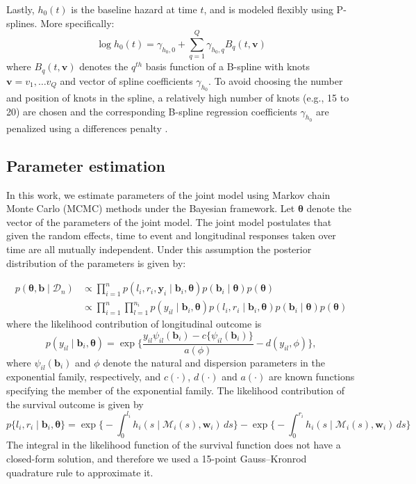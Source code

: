 Lastly, $h_0(t)$ is the baseline hazard at time $t$, and is modeled flexibly using P-splines. More specifically:
\begin{equation*}
\log{h_0(t)} = \gamma_{h_0,0} + \sum_{q=1}^Q \gamma_{h_0,q} B_q(t, \boldsymbol{v})
\end{equation*}
where $B_q(t, \boldsymbol{v})$ denotes the $q^{th}$ basis function of a B-spline with knots $\boldsymbol{v} = v_1, \ldots v_Q$ and vector of spline coefficients $\gamma_{h_0}$. To avoid choosing the number and position of knots in the spline, a relatively high number of knots (e.g., 15 to 20) are chosen and the corresponding B-spline regression coefficients $\gamma_{h_0}$ are penalized using a differences penalty \citep{eilers1996flexible}.

\subsection{Parameter estimation}
In this work, we estimate parameters of the joint model using Markov chain Monte Carlo (MCMC) methods under the Bayesian framework. Let $\boldsymbol{\theta}$ denote the vector of the parameters of the joint model. The joint model postulates that given the random effects, time to event and longitudinal responses taken over time are all mutually independent. Under this assumption the posterior distribution of the parameters is given by:

\begin{align*}
p(\boldsymbol{\theta}, \boldsymbol{b} \mid \mathcal{D}_n) & \propto \prod_{i=1}^n p(l_i, r_i, \boldsymbol{y}_i \mid \boldsymbol{b}_i, \boldsymbol{\theta}) p(\boldsymbol{b}_i \mid \boldsymbol{\theta}) p(\boldsymbol{\theta})\\
& \propto \prod_{i=1}^n  \prod_{l=1}^{n_i} p(y_{il} \mid \boldsymbol{b}_i, \boldsymbol{\theta}) p(l_i, r_i \mid \boldsymbol{b}_i, \boldsymbol{\theta})  p(\boldsymbol{b}_i \mid \boldsymbol{\theta}) p(\boldsymbol{\theta})
\end{align*}
where the likelihood contribution of longitudinal outcome is
\begin{equation*}
p(y_{il}\mid \boldsymbol{b}_i,\boldsymbol{\theta})=
\exp\Bigg\{\frac{y_{il}\psi_{il}(\boldsymbol{b}_i)-c\{\psi_{il}(\boldsymbol{b}_i)\}}{a(\phi)} -d( y_{il},\phi)         \Bigg\},
\end{equation*}
where $\psi_{il}(\boldsymbol{b}_i)$ and $\phi$ denote the natural and dispersion parameters in the exponential family, respectively, and $c(\cdot)$, $d(\cdot)$ and $a(\cdot)$ are known functions specifying the member of the exponential family. The likelihood contribution of the survival outcome is given by
\begin{equation*}
p\{l_i,r_i\mid \boldsymbol{b}_i,\boldsymbol{\theta}\} = \exp\Big\{-\int_0^{l_i} h_i(s \mid \mathcal{M}_i(s), \boldsymbol{w}_i)\,ds\Big\} - \exp\Big\{-\int_0^{r_i}h_i(s \mid \mathcal{M}_i(s), \boldsymbol{w}_i)\,ds\Big\}
\end{equation*}
The integral in the likelihood function of the survival function does not have a closed-form solution, and therefore we used a 15-point Gauss–Kronrod quadrature rule to approximate it.\\

